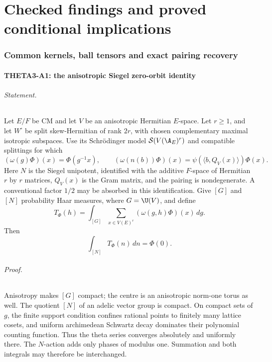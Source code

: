 \documentclass[11pt]{article}
\theoremstyle{definition}\newtheorem{definition}[theorem]{Definition}\newtheorem{remark}[theorem]{Remark}
\begin{document}
\part{Checked findings and proved conditional implications}

\section{Common kernels, ball tensors and exact pairing recovery}

\subsection{THETA3-A1: the anisotropic Siegel zero-orbit identity}\label{A1}

\paragraph{Statement.}
Let $E/F$ be CM and let $V$ be an anisotropic Hermitian $E$-space.
Let $r\geq1$, and let $W^{\square}$ be split skew-Hermitian of rank
$2r$, with chosen complementary maximal isotropic subspaces. Use its
Schr\"odinger model $\mathcal S(V(\A_E)^r)$ and compatible splittings
for which
\[
 (\omega(g)\Phi)(x)=\Phi(g^{-1}x),\qquad
 (\omega(n(b))\Phi)(x)=\psi(\langle b,Q_V(x)\rangle)\Phi(x).
\]
Here $N$ is the Siegel unipotent, identified with the additive
$F$-space of Hermitian $r$ by $r$ matrices, $Q_V(x)$ is the Gram
matrix, and the pairing is nondegenerate. A conventional factor
$1/2$ may be absorbed in this identification. Give $[G]$ and $[N]$
probability Haar measures, where $G=\U(V)$, and define
\[
 T_\Phi(h)=\int_{[G]}\sum_{x\in V(E)^r}(\omega(g,h)\Phi)(x)\,dg.
\]
Then
\begin{equation}\label{A1-eq}
                    \int_{[N]}T_\Phi(n)\,dn=\Phi(0).
\end{equation}

\paragraph{Proof.}
Anisotropy makes $[G]$ compact; the centre is an anisotropic norm-one
torus as well. The quotient $[N]$ of an adelic vector group is compact.
On compact sets of $g$, the finite support condition confines rational
points to finitely many lattice cosets, and uniform archimedean
Schwartz decay dominates their polynomial counting function. Thus the
theta series converges absolutely and uniformly there. The $N$-action
adds only phases of modulus one. Summation and both integrals may
therefore be interchanged.
\end{document}
